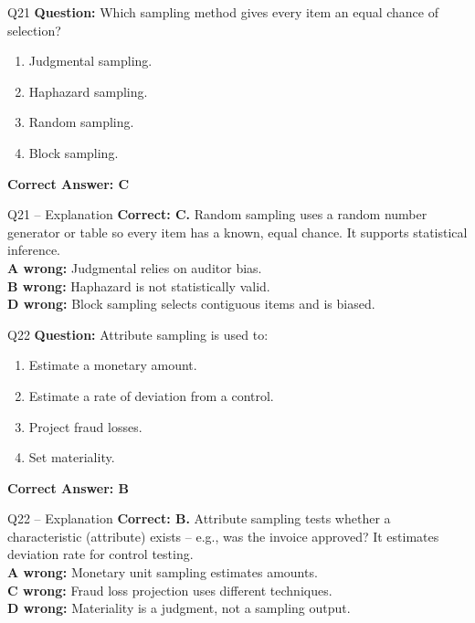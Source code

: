 \documentclass[aspectratio=169,10pt]{beamer}
\begin{document}
	\begin{frame}[t]{Q21}
		\small
		\textbf{Question:} Which sampling method gives every item an equal chance of selection?
		\begin{enumerate}[label=\Alph*.,itemsep=1pt,topsep=2pt]
			\item Judgmental sampling.
			\item Haphazard sampling.
			\item Random sampling.
			\item Block sampling.
		\end{enumerate}
		\vspace{4pt}
		\textbf{Correct Answer: C}
	\end{frame}
	
	\begin{frame}[t]{Q21 -- Explanation}
		\small
		\textbf{Correct: C.} Random sampling uses a random number generator or table so every item has a known, equal chance. It supports statistical inference. \\[4pt]
		\textbf{A wrong:} Judgmental relies on auditor bias. \\[2pt]
		\textbf{B wrong:} Haphazard is not statistically valid. \\[2pt]
		\textbf{D wrong:} Block sampling selects contiguous items and is biased.
	\end{frame}
	
	\begin{frame}[t]{Q22}
		\small
		\textbf{Question:} Attribute sampling is used to:
		\begin{enumerate}[label=\Alph*.,itemsep=1pt,topsep=2pt]
			\item Estimate a monetary amount.
			\item Estimate a rate of deviation from a control.
			\item Project fraud losses.
			\item Set materiality.
		\end{enumerate}
		\vspace{4pt}
		\textbf{Correct Answer: B}
	\end{frame}
	
	\begin{frame}[t]{Q22 -- Explanation}
		\small
		\textbf{Correct: B.} Attribute sampling tests whether a characteristic (attribute) exists -- e.g., was the invoice approved? It estimates deviation rate for control testing. \\[4pt]
		\textbf{A wrong:} Monetary unit sampling estimates amounts. \\[2pt]
		\textbf{C wrong:} Fraud loss projection uses different techniques. \\[2pt]
		\textbf{D wrong:} Materiality is a judgment, not a sampling output.
	\end{frame}
	
\end{document}
